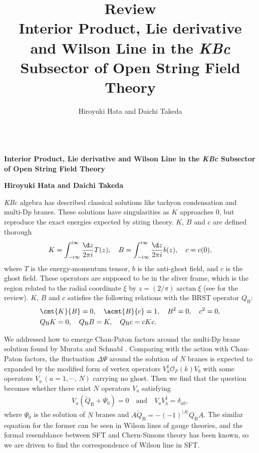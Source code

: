 \documentclass[12pt]{article}
\title{\textbf{Review}\\
Interior Product, Lie derivative and Wilson Line in the \textit{KBc} Subsector of Open String Field Theory
}
\author{Hiroyuki Hata and Daichi Takeda}
\date{}
\begin{document}
{\Large{}\\[2mm]
\textbf{Interior Product, Lie derivative and Wilson Line in the \textit{KBc} Subsector of Open String Field Theory
}
}

\noindent
\hfill\textbf{Hiroyuki Hata and Daichi Takeda}

\vspace{12pt}
\textit{KBc} algebra has described classical solutions like tachyon condensation and multi-$\mathrm{D}p$ branes.
These solutions have singularities as $K$ approaches $0$, but reproduce the exact energies expected by string theory.
$K$, $B$ and $c$ are defined thorough
\begin{align}
	K = \int_{-i\infty}^{i\infty}\frac{\d z}{2\pi i}T(z),\quad
	B =  \int_{-i\infty}^{i\infty}\frac{\d z}{2\pi i}b(z),\quad 
	c = c(0),
\end{align}
where $T$ is the energy-momentum tensor, $b$ is the anti-ghost field, and $c$ is the ghost field.
These operators are supposed to be in the sliver frame, which is the region related to the radial coordinate $\xi$ by $z = (2/\pi)\arctan \xi$ (see \cite{Okawa:2012ica} for the review).
$K$, $B$ and $c$ satisfies the following relations with the BRST operator $Q_\mathrm{B}$:
\begin{align}
	&\cmt{K}{B} = 0,\quad
	\acmt{B}{c} = 1,\quad
	B^2 = 0,\quad
	c^2 = 0,\\
	&Q_\mathrm{B}K = 0,\quad
	Q_\mathrm{B}B = K,\quad
	Q_\mathrm{B}c = cKc.
\end{align}

We addressed how to emerge Chan-Paton factors around the multi-$\mathrm{D}p$ brane solution found by Murata and Schnabl \cite{Murata:2011ex}.
Comparing with the action with Chan-Paton factors, the fluctuation $\Delta\Psi$ around the solution of $N$ branes is expected to expanded by the modified form of vertex operators $V_a^\ddag\mathcal O_F(k) V_b$  with some operators $V_a\,(a = 1,\cdots,\,N)$ carrying no ghost.
Then we find that the question becomes whether there exist $N$ operators $V_a$ satisfying
\begin{align}
	V_a(\overleftarrow Q_\mathrm{B}+\Psi_0) = 0\quad
	\mathrm{and}\quad 
	V_aV_b^\ddag = \delta_{ab},\label{eq:Va_coditions}
\end{align}
where $\Psi_0$ is the solution of $N$ branes and $A\overleftarrow Q_\mathrm{B} = -(-1)^{|A|}Q_\mathrm{B}A$.
The similar equation for the former can be seen in Wilson lines of gauge theories, and the formal resemblance between SFT and Chern-Simons theory has been known,
so we are driven to find the correspondence of Wilson line in SFT.
\end{document}
